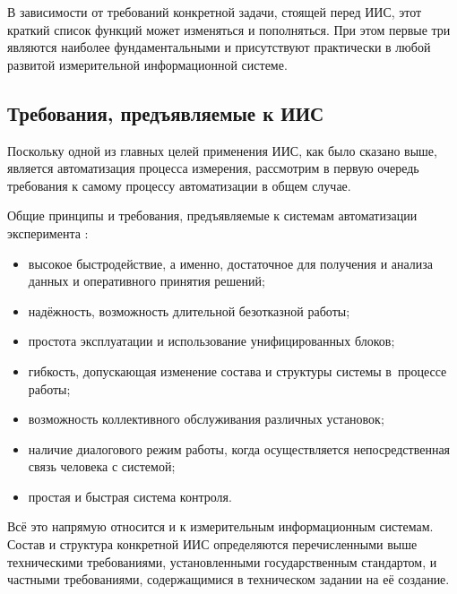 \documentclass[a4paper, 14pt, titlepage]{extarticle}
\begin{document}
  В зависимости от требований конкретной задачи, стоящей перед ИИС, этот краткий список функций
  может изменяться и пополняться. При этом первые три являются наиболее фундаментальными и
  присутствуют практически в любой развитой измерительной информационной системе. %

  \subsection{Требования, предъявляемые к ИИС}\label{ssec:iis-requirements}

  Поскольку одной из главных целей применения ИИС, как было сказано выше, является автоматизация процесса
  измерения, рассмотрим в первую очередь требования к самому процессу автоматизации в общем случае.

  Общие принципы и требования, предъявляемые к системам автоматизации эксперимента \cite{vinogradov-discrete, kurochkin-kamak}:
  \begin{itemize}
    \item высокое быстродействие, а именно, достаточное для получения и анализа данных и оперативного принятия решений;
    \item надёжность, возможность длительной безотказной работы;
    \item простота эксплуатации и использование унифицированных блоков;
    \item гибкость, допускающая изменение состава и структуры системы в~процессе работы;
    \item возможность коллективного обслуживания различных установок;
    \item наличие диалогового режим работы, когда осуществляется непосредственная связь человека с системой;
    \item простая и быстрая система контроля.
  \end{itemize}

  Всё это напрямую относится и к измерительным информационным системам.  Состав и структура
  конкретной ИИС определяются перечисленными выше техническими требованиями, установленными
  государственным стандартом, и частными требованиями, содержащимися в техническом задании на её
  создание.
\end{document}
